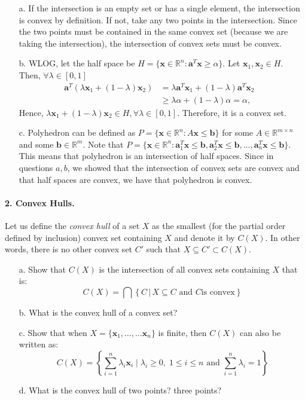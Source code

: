 \documentclass[11pt]{article}
\newcommand{\bx}{\mathbf{x}}
\newcommand{\ba}{\mathbf{a}}
\begin{document}
\color{blue}
\begin{itemize}
\item [a.] If the intersection is an empty set or has a single element, the intersection is convex by definition. If not, take any two points in the intersection. Since the two points must be contained in the same convex set (because we are taking the intersection), the intersection of convex sets must be convex.
\item [b.] WLOG, let the half space be $H=\{\bx \in \mathbb{R}^n: \ba^T \bx \geq \alpha\}$. Let $\bx_1,\bx_2 \in H$. Then, $\forall \lambda \in [0,1]$
\begin{align*}
\ba^T(\lambda \bx_1 + (1-\lambda) \bx_2) &= \lambda \ba^T \bx_1 + (1 - \lambda) \ba^T \bx_2 &\\
& \geq \lambda \alpha + (1 - \lambda) \alpha = \alpha, 
\end{align*}
Hence, $\lambda \bx_1 + (1-\lambda) \bx_2 \in H, \forall \lambda \in [0,1]$. Therefore, it is a convex set.
\item [c.] Polyhedron can be defined as $P=\{\bx \in \mathbb{R}^n: A\bx \leq \textbf{b} \}$ for some $A\in \mathbb{R}^{m\times n}$ and some $\textbf{b} \in \mathbb{R}^m$.
Note that $P=\{\bx \in \mathbb{R}^n: \ba_1^T \bx \leq \textbf{b}, \ba_2^T \bx \leq \textbf{b}, ..., \ba_n^T \bx \leq \textbf{b} \}$.
This means that polyhedron is an intersection of half spaces. Since in questions $a,b$, we showed that the intersection of convex sets are convex and that half spaces are convex, we have that polyhedron is convex.
\end{itemize}
\color{black}

\paragraph{2. Convex Hulls.}

Let us define the \emph{convex hull} of a set $X$ as the smallest (for the
partial order defined by inclusion) convex set containing $X$ and denote it by
$C(X)$. In other words, there is no other convex set $C'$ such that $X\subseteq
C'\subset C(X)$.

\begin{itemize}
    \item[a.]  Show that $C(X)$ is the intersection of all convex sets
        containing $X$ that is:
        \begin{displaymath}
            C(X) = \bigcap \left \{ C \,|\, X\subseteq C \text{ and } C \text{
            is convex}\right\}
        \end{displaymath}
    \item[b.] What is the convex hull of a convex set?
    \item[c.]
        Show that when $X = \{\bx_1,\ldots,\ldots \bx_n\}$ is finite, then
        $C(X)$ can also be written as: \begin{displaymath} C(X)
            = \left\{\sum_{i=1}^n \lambda_i \bx_i\;|\;\lambda_i\geq 0,\;1\leq
            i\leq n\text{ and } \sum_{i=1}^n \lambda_i=1\right\}
        \end{displaymath}
    \item [d.] What is the convex hull of two points? three points?
\end{itemize}
\end{document}
